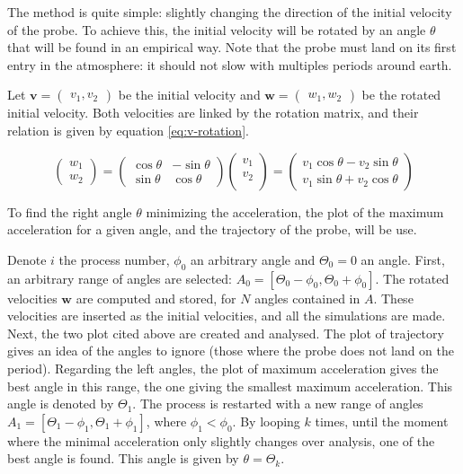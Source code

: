 \documentclass[a4paper,12pt,twoside]{article}
\begin{document}
The method is quite simple: slightly changing the direction of the initial velocity of the probe.
To achieve this, the initial velocity will be rotated by an angle $\theta$ that will be found in an empirical way.
Note that the probe must land on its first entry in the atmosphere: it should not slow with multiples periods around earth. %

Let $\mathbf{v} = \begin{pmatrix} v_1, v_2\end{pmatrix}$ be the initial velocity and $\mathbf{w} = \begin{pmatrix} w_1, w_2\end{pmatrix}$ be the rotated initial velocity.
Both velocities are linked by the rotation matrix, and their relation is given by equation \eqref{eq:v-rotation}.

\begin{equation}
  \begin{pmatrix}
    w_1 \\
    w_2
  \end{pmatrix}
  =
  \begin{pmatrix}
    \cos\theta & -\sin\theta \\
    \sin\theta & \cos\theta
  \end{pmatrix}
  \begin{pmatrix}
    v_1 \\
    v_2 \\
  \end{pmatrix}
  =
  \begin{pmatrix}
    v_1\cos\theta - v_2\sin\theta \\
    v_1\sin\theta + v_2\cos\theta
  \end{pmatrix}
  \label{eq:v-rotation}
\end{equation}

To find the right angle $\theta$ minimizing the acceleration, the plot of the maximum acceleration for a given angle, and the trajectory of the probe, will be use.

Denote $i$ the process number, $\phi_0$ an arbitrary angle and $\Theta_0 = 0$ an angle.
First, an arbitrary range of angles are selected: $A_0 = [\Theta_0-\phi_0, \Theta_0+\phi_0]$.
The rotated velocities $\mathbf{w}$ are computed and stored, for $N$ angles contained in $A$.
These velocities are inserted as the initial velocities, and all the simulations are made.
Next, the two plot cited above are created and analysed.
The plot of trajectory gives an idea of the angles to ignore (those where the probe does not land on the period).
Regarding the left angles, the plot of maximum acceleration gives the best angle in this range, the one giving the smallest maximum acceleration. This angle is denoted by $\Theta_1$.
The process is restarted with a new range of angles $A_1 = [\Theta_1 - \phi_1, \Theta_1 + \phi_1]$, where $\phi_1 < \phi_0$.
By looping $k$ times, until the moment where the minimal acceleration only slightly changes over analysis,  one of the best angle is found.
This angle is given by $\theta = \Theta_k$.
\end{document}
